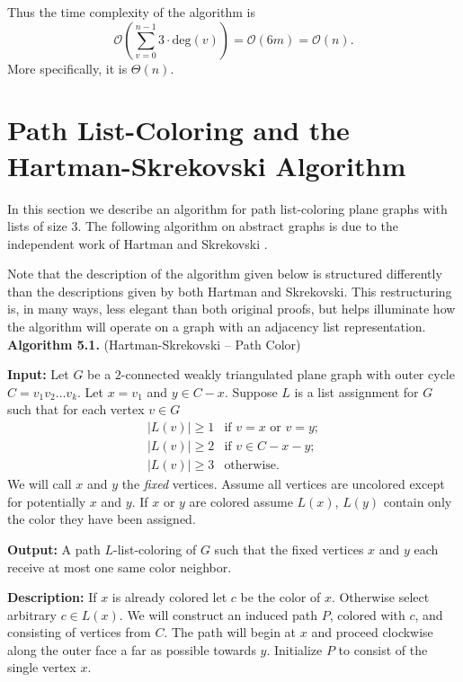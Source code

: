 \documentclass[letterpaper, 12pt]{article}
\theoremstyle{definition}
\theoremstyle{definition}
\theoremstyle{thm}
\theoremstyle{definition}
\begin{document}
Thus the time complexity of the algorithm is
\[
    \mathcal{O}\left(\sum_{v=0}^{n-1}3\cdot\text{deg}(v)\right)
    =\mathcal{O}(6m)=\mathcal{O}(n).
\]
More specifically, it is $\Theta(n)$.



\section{Path List-Coloring and the Hartman-Skrekovski Algorithm}

In this section we describe an algorithm for path
list-coloring plane graphs with lists of size $3$. The following algorithm on
abstract graphs is due to the independent work of Hartman \cite{hartman} and
Skrekovski \cite{skrekovski}.

Note that the description of the algorithm given below is structured differently
than the descriptions given by both Hartman and Skrekovski. This restructuring is, in
many ways, less elegant than both original proofs, but helps illuminate how the
algorithm will operate on a graph with an adjacency list representation.\\

\noindent\textbf{Algorithm 5.1.} (Hartman-Skrekovski -- Path Color)

\noindent\textbf{Input:} Let $G$ be a $2$-connected weakly triangulated plane
graph with outer cycle $C=v_1v_2\ldots v_k$. Let $x=v_1$ and $y\in C-x$.
Suppose $L$ is a list assignment for $G$ such that
for each vertex $v\in G$
\[
    \begin{array}{ll}
	    |L(v)|\ge 1 & \text{if } v=x \text{ or } v=y;\\
	    |L(v)|\ge 2 & \text{if } v\in C-x-y;\\
	    |L(v)|\ge 3 & \text{otherwise.}
    \end{array}
\]
We will call $x$ and $y$ the \textit{fixed} vertices. Assume all vertices are
uncolored except for potentially $x$ and $y$. If $x$ or $y$ are colored assume
$L(x)$, $L(y)$ contain only the color they have been assigned. 

\noindent\textbf{Output:} A path $L$-list-coloring of $G$ such that the fixed
vertices $x$ and $y$ each receive at most one same color neighbor.

\noindent\textbf{Description:} If $x$ is already colored
let $c$ be the color of $x$. Otherwise select arbitrary $c\in L(x)$. We will 
construct an induced path $P$, colored with $c$, and consisting of vertices from
$C$. The path will begin at $x$ and proceed clockwise along the outer face a
far as possible towards $y$. Initialize $P$ to consist of the single vertex
$x$.
\end{document}
